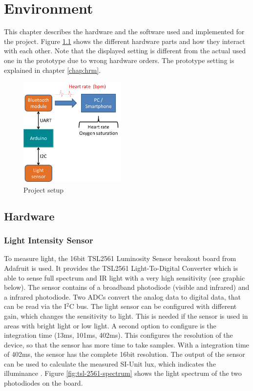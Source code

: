 \documentclass[oneside, notitlepage]{scrreprt}
\begin{document}
\chapter{Environment}
\label{chap:environment}

This chapter describes the hardware and the software used and implemented for the project. Figure \ref{fig:data-flow} shows the different hardware parts and how they interact with each other. Note that the displayed setting is different from the actual used one in the prototype due to wrong hardware orders. The prototype setting is explained in chapter \ref{chap:hrm}.

\begin{figure}[H]
	\centering
	\includegraphics[width=200px]{images/general_dataFlow.png}
	\caption{Project setup}
	\label{fig:data-flow}
\end{figure}

\section{Hardware}
\subsection{Light Intensity Sensor}
\label{subsec:light-intensity-sensor-hardware}

To measure light, the 16bit TSL2561 Luminosity Sensor breakout board from Adafruit is used. It provides the TSL2561 Light-To-Digital Converter which is able to sense full spectrum and IR light with a very high sensitivity (see graphic below). The sensor contains of a broadband photodiode (visible and infrared) and a infrared photodiode. Two ADCs convert the analog data to digital data, that can be read via the I$^{2}$C bus. The light sensor can be configured with different gain, which changes the sensitivity to light. This is needed if the sensor is used in areas with bright light or low light. A second option to configure is the integration time (13ms, 101ms, 402ms). This configures the resolution of the device, so that the sensor has more time to take samples. With a integration time of 402ms, the sensor has the complete 16bit resolution. The output of the sensor can be used to calculate the measured SI-Unit lux, which indicates the illuminance \cite{bib:tsl-sensor}. Figure \ref{fig:tsl-2561-spectrum} shows the light spectrum of the two photodiodes on the board.
\end{document}
